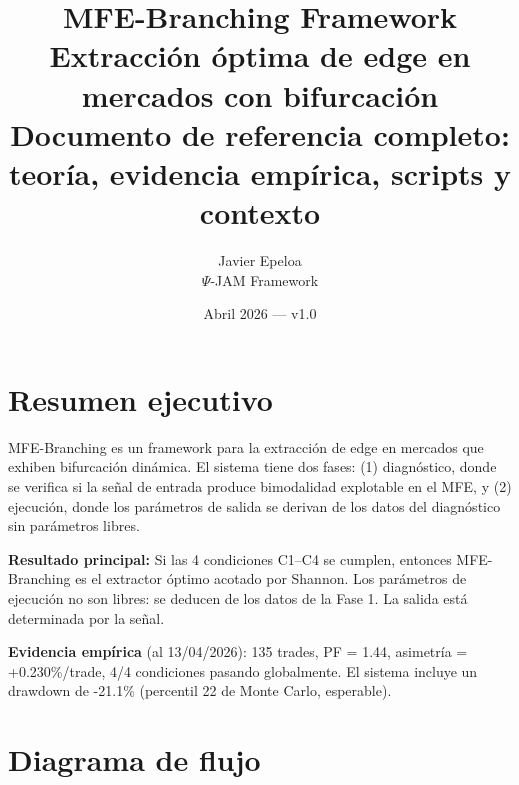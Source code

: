 \documentclass[11pt,a4paper]{article}
\title{\textbf{MFE-Branching Framework}\\[0.3em]
\large Extracción óptima de edge en mercados con bifurcación\\[0.2em]
\normalsize Documento de referencia completo: teoría, evidencia empírica, scripts y contexto}
\author{Javier Epeloa\\$\Psi$-JAM Framework}
\date{Abril 2026 — v1.0}
\begin{document}
\maketitle
\tableofcontents
\newpage
 
\section{Resumen ejecutivo}
 
MFE-Branching es un framework para la extracción de edge en mercados que exhiben bifurcación dinámica. El sistema tiene dos fases: (1) diagnóstico, donde se verifica si la señal de entrada produce bimodalidad explotable en el MFE, y (2) ejecución, donde los parámetros de salida se derivan de los datos del diagnóstico sin parámetros libres.
 
\textbf{Resultado principal:} Si las 4 condiciones C1--C4 se cumplen, entonces MFE-Branching es el extractor óptimo acotado por Shannon. Los parámetros de ejecución no son libres: se deducen de los datos de la Fase 1. La salida está determinada por la señal.
 
\textbf{Evidencia empírica} (al 13/04/2026): 135 trades, PF = 1.44, asimetría = +0.230\%/trade, 4/4 condiciones pasando globalmente. El sistema incluye un drawdown de -21.1\% (percentil 22 de Monte Carlo, esperable).
 
\section{Diagrama de flujo}
 
\end{document}
